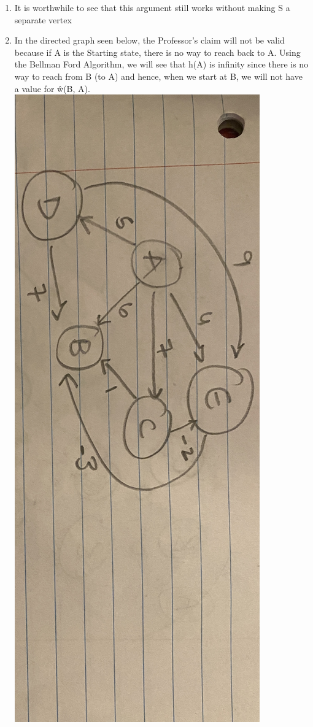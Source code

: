 \documentclass[11pt]{article}
\begin{document}
\begin{enumerate}
\begin{enumerate}
\begin{enumerate}
    \end{enumerate}
    \item It is worthwhile to see that this argument still works without making S a separate vertex
    \item In the directed graph seen below, the Professor's claim will not be valid because if A is the Starting state, there is no way to reach back to A. Using the Bellman Ford Algorithm, we will see that h(A) is infinity since there is no way to reach from B (to A) and hence, when we start at B, we will not have a value for \^w(B, A). 
    \\ \includegraphics[scale=0.1,angle=90]{IMG_8569.JPG}
\end{enumerate}


\end{enumerate}
\end{document}
